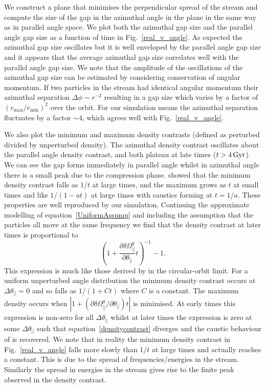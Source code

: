 \documentclass[useAMS,usenatbib,fleqn,a4paper]{mn2e}
\def\Gyr{\,{\rm Gyr}}
\begin{document}
We construct a plane that minimises the perpendicular spread of the stream and compute the size of the gap in the azimuthal angle in the plane in the same way as in parallel angle space. We plot both the azimuthal gap size and the parallel angle gap size as a function of time in Fig.~\ref{real_v_angle}. As expected the azimuthal gap size oscillates but it is well enveloped by the parallel angle gap size and it appears that the average azimuthal gap size correlates well with the parallel angle gap size. We note that the amplitude of the oscillations of the azimuthal gap size can be estimated by considering conservation of angular momentum. If two particles in the stream had identical angular momentum their azimuthal separation $\Delta\phi\sim r^{-2}$ resulting in a gap size which varies by a factor of $(r_\mathrm{max}/r_\mathrm{min})^2$ over the orbit. For our simulation means the azimuthal separation fluctuates by a factor $\sim 4$, which agrees well with Fig.~\ref{real_v_angle}.

We also plot the minimum and maximum density contrasts (defined as perturbed divided by unperturbed density). The azimuthal density contrast oscillates about the parallel angle density contrast, and both plateau at late times ($t>4\Gyr$). We can see the gap forms immediately in parallel angle whilst in azimuthal angle there is a small peak due to the compression phase. \cite{ErkalBelokurov2015} showed that the minimum density contrast falls as $1/t$ at large times, and the maximum grows as $t$ at small times and like $1/(1-at)$ at large times with caustics forming at $t=1/a$. These properties are well reproduced by our simulation. Continuing the approximate modelling of equation~\eqref{UniformAssump} and including the assumption that the particles all move at the same frequency we find that the density contrast at later times is proportional to
\begin{equation}
(1+\frac{\partial\delta\Omega^g_{||}}{\partial\theta_{||}}t)^{-1}-1.
\label{densitycontrast}
\end{equation}
This expression is much like those derived by \cite{ErkalBelokurov2015} in the circular-orbit limit. For a uniform unperturbed angle distribution the minimum density contrast occurs at $\Delta\theta_{||}=0$ and so falls as $1/(1+Ct)$ where $C$ is a constant. The maximum density occurs when $|1+(\partial\delta\Omega^g_{||}/\partial\theta_{||})t|$ is minimised. At early times this expression is non-zero for all $\Delta\theta_{||}$ whilst at later times the expression is zero at some $\Delta\theta_{||}$ such that equation~\eqref{densitycontrast} diverges and the caustic behaviour of \cite{ErkalBelokurov2015} is recovered. We note that in reality the minimum density contrast in Fig.~\ref{real_v_angle} falls more slowly than $1/t$ at large times and actually reaches a constant. This is due to the spread of frequencies/energies in the stream. Similarly the spread in energies in the stream gives rise to the finite peak observed in the density contrast.
\end{document}

